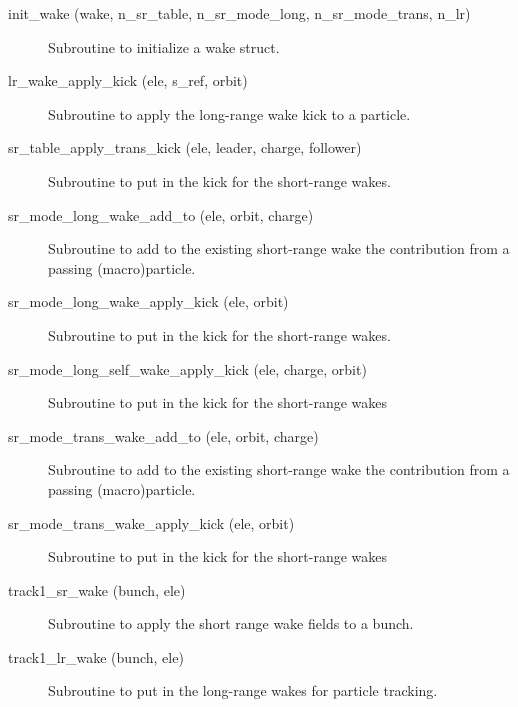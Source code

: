\begin{description}

\item[init_wake (wake, n_sr_table, n_sr_mode_long, n_sr_mode_trans, n_lr)] \Newline 
Subroutine to initialize a wake struct.

\item[lr_wake_apply_kick (ele, s_ref, orbit)] \Newline 
Subroutine to apply the long-range wake kick to a particle.

\item[sr_table_apply_trans_kick (ele, leader, charge, follower)] \Newline 
Subroutine to put in the kick for the short-range wakes.

\item[sr_mode_long_wake_add_to (ele, orbit, charge)] \Newline 
Subroutine to add to the existing short-range wake the contribution from
a passing (macro)particle.

\item[sr_mode_long_wake_apply_kick (ele, orbit)] \Newline 
Subroutine to put in the kick for the short-range wakes.

\item[sr_mode_long_self_wake_apply_kick (ele, charge, orbit)] \Newline 
Subroutine to put in the kick for the short-range wakes

\item[sr_mode_trans_wake_add_to (ele, orbit, charge)] \Newline 
Subroutine to add to the existing short-range wake the contribution from
a passing (macro)particle.

\item[sr_mode_trans_wake_apply_kick (ele, orbit)] \Newline 
Subroutine to put in the kick for the short-range wakes

\item[track1_sr_wake (bunch, ele)] \Newline 
Subroutine to apply the short range wake fields to a bunch. 

\item[track1_lr_wake (bunch, ele)] \Newline 
Subroutine to put in the long-range wakes for particle tracking.

\end{description}

